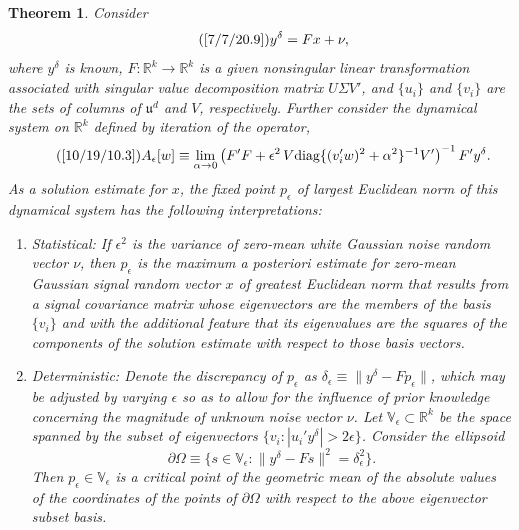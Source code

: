 \documentclass{amsart}
\numberwithin{equation}{section}
\newtheorem{theorem}{Theorem}
\theoremstyle{definition}
\numberwithin{theorem}{section}
\begin{document}
 \begin{theorem} \label{7/6/21.6} Consider \begin{equation} \tag{\ref{7/7/20.9}} y^\delta = F x +\nu, \end{equation} where $y^\delta$ is known, $F:\mathbb{R}^k\rightarrow\mathbb{R}^k$ is a given nonsingular linear transformation associated with singular value decomposition matrix $U\Sigma V'$, and $\{u_i\}$ and $\{v_i\}$ are the sets of columns of $\mathfrak{u}^d$ and $V$, respectively.  Further consider the dynamical system on $\mathbb{R}^k$ defined by iteration of the operator, \begin{equation}\tag{\ref{10/19/10.3}} A_\epsilon[w] \equiv \lim_{\alpha\rightarrow 0}\left(F'F+\epsilon^2\, V\mbox{\rm diag}\{(v_i'w)^2 + \alpha^2\}^{-1}V' \right)^{-1} F'y^\delta. \end{equation} 
As a solution estimate for $x$, the fixed point $p_\epsilon$ of largest Euclidean norm of this dynamical system  has the following interpretations:
\begin{enumerate}\item {\rm Statistical:} If $\epsilon^2$ is the variance of zero-mean white Gaussian noise random vector $\nu$, then 
$p_\epsilon$ is the  {\rm maximum a posteriori} estimate for zero-mean Gaussian signal random vector $x$ of greatest Euclidean norm
 that results from a signal covariance matrix  whose eigenvectors are the members of the basis $\{v_i\}$ and with the additional feature that its eigenvalues are the squares of the components of the solution estimate with respect to those basis vectors.   
 \item  
{\rm Deterministic:} Denote the discrepancy of $p_\epsilon$ as $\delta_\epsilon \equiv \| y^\delta - Fp_\epsilon\|$, which may be adjusted by varying $\epsilon$ so as to allow for the influence of prior knowledge concerning the magnitude of unknown noise vector $\nu$.  Let $\mathbb{V}_\epsilon \subset \mathbb{R}^k$ be the space spanned by the subset of eigenvectors $\{v_i: |u_i'y^\delta| > 2\epsilon \}$.  
 Consider the ellipsoid \[ \partial\Omega \equiv \{ s\in \mathbb{V}_\epsilon: \| y^\delta - Fs\|^2 = \delta_\epsilon^2 \}.\]   Then $p_\epsilon\in \mathbb{V}_\epsilon$ is a critical point of the geometric mean of the absolute values of the coordinates of the points of $\partial\Omega$ with respect to the above eigenvector subset basis.
\end{enumerate}
\end{theorem}
\end{document}
